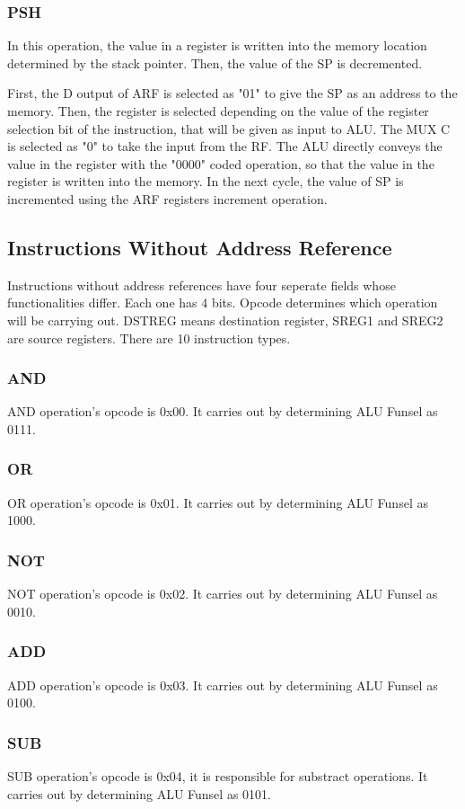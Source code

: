 \documentclass[pdftex,12pt,a4paper]{article}
\begin{document}
\subsubsection{PSH}
In this operation, the value in a register is written into the memory location determined by the stack pointer.
Then, the value of the SP is decremented.

First, the D output of ARF is selected as "01" to give the SP as an address to the memory. Then, the register is 
selected depending on the value of the register selection bit of the instruction, that will be given as input to ALU.
The MUX C is selected as "0" to take the input from the RF. The ALU directly conveys the value in the register with 
the "0000" coded operation, so that the value in the register is written into the memory. In the next cycle, the value 
of SP is incremented using the ARF registers increment operation.


\subsection{Instructions Without Address Reference}
    Instructions without address references have four seperate fields whose functionalities differ. Each one has 4 bits. Opcode determines which operation
will be carrying out. DSTREG means destination register, SREG1 and SREG2 are source registers. There are 10 instruction types.
\subsubsection{AND}
    AND operation's opcode is 0x00. It carries out by determining ALU Funsel as 0111.
\subsubsection{OR}
    OR operation's opcode is 0x01. It carries out by determining ALU Funsel as 1000.
\subsubsection{NOT}
    NOT operation's opcode is 0x02. It carries out by determining ALU Funsel as 0010.
\subsubsection{ADD}
    ADD operation's opcode is 0x03. It carries out by determining ALU Funsel as 0100.
\subsubsection{SUB}
    SUB operation's opcode is 0x04, it is responsible for substract operations. It carries out by determining ALU Funsel as 0101.
\end{document}
